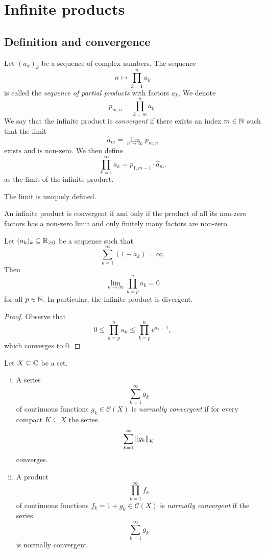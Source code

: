 \section{Infinite products}

\subsection{Definition and convergence}

\begin{definicija}
Let $(a_k)_k$ be a sequence of complex numbers. The sequence
\[
n \mapsto \prod_{k=1}^n a_k
\]
is called the
\emph{sequence of partial products} with
factors $a_k$. We denote
\[
p_{m,n} = \prod_{k=m}^n a_k.
\]
We say that the infinite product is \emph{convergent} if there
exists an index $m \in \mathbb{N}$ such that the limit
\[
\widehat{a}_m = \lim_{n \to \infty} p_{m,n}
\]
exists and is non-zero. We then define
\[
\prod_{k=1}^\infty a_k = p_{1, m-1} \cdot  \widehat{a}_m.
\]
as the limit of the infinite product.
\end{definicija}

\begin{opomba}
The limit is uniquely defined.
\end{opomba}

\begin{opomba}
An infinite product is convergent if and only if the product of all
its non-zero factors has a non-zero limit and only finitely many
factors are non-zero.
\end{opomba}


\begin{lema}
Let $(a_k)_k \subseteq \mathbb{R}_{\geq 0}$ be a sequence such that
\[
\sum_{k=1}^\infty (1 - a_k) = \infty.
\]
Then
\[
\lim_{n \to \infty} \prod_{k=p}^n a_k = 0
\]
for all $p \in \mathbb{N}$. In particular, the infinite product is
divergent.
\end{lema}

\begin{proof}
Observe that
\[
0 \leq
\prod_{k=p}^n a_k \leq
\prod_{k=p}^n e^{a_k - 1},
\]
which converges to $0$.
\end{proof}

\begin{definicija}
Let $X \subseteq \mathbb{C}$ be a set.

\begin{enumerate}[i)]
\item A series
\[
\sum_{k=1}^\infty g_k
\]
of continuous functions $g_k \in \mathcal{C}(X)$ is
\emph{normally convergent} if for
every compact $K \subseteq X$ the series
\[
\sum_{k=1}^\infty \left\lVert g_k\right\rVert_K
\]
converges.

\item A product
\[
\prod_{k=1}^\infty f_k
\]
of continuous functions $f_k = 1 + g_k \in \mathcal{C}(X)$ is
\emph{normally convergent} if the series
\[
\sum_{k=1}^\infty g_k
\]
is normally convergent.
\end{enumerate}
\end{definicija}

